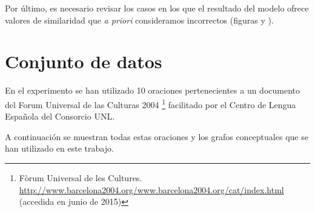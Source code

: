 \documentclass[a4paper,12pt,spanish]{book}
\begin{document}
Por último, es necesario revisar los casos en los que el resultado del modelo ofrece
valores de similaridad que \emph{a priori} consideramos incorrectos (figuras
{\hyperref[5.pruebas/index:sample07-measures-yandex-synset]{\emph{}}} y {\hyperref[5.pruebas/index:sample09-relation-tol-0]{\emph{}}}).
\newpage


\appendix
{}\label{appendix-data::doc}

\chapter{Conjunto de datos}
\label{appendix-data:appendix-data}\label{appendix-data::doc}\label{appendix-data:conjunto-de-datos}
En el experimento se han utilizado 10 oraciones pertenecientes a un
documento del Forum Universal de las Culturas 2004 \footnote{
Fòrum Universal de les Cultures.
\href{http://www.barcelona2004.org/www.barcelona2004.org/cat/index.html}{http://www.barcelona2004.org/www.barcelona2004.org/cat/index.html}
(accedida en junio de 2015)
} facilitado por el
Centro de Lengua Española del Consorcio UNL.

A continuación se muestran todas estas oraciones y los grafos conceptuales
que se han utilizado en este trabajo.
\clearpage
\end{document}
